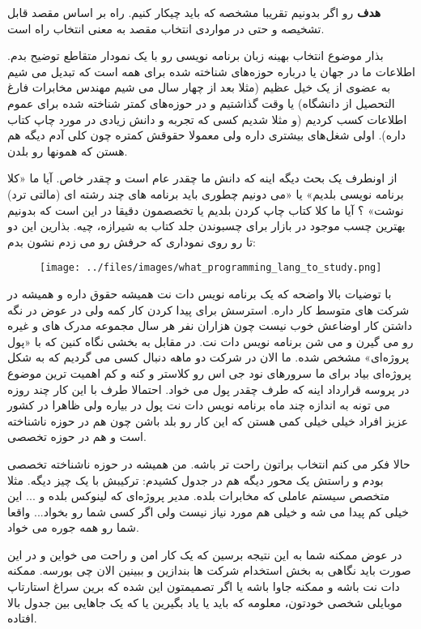 \textbf{هدف}
رو اگر بدونیم تقریبا مشخصه که باید چیکار کنیم. راه بر اساس مقصد قابل تشخیصه و حتی در مواردی انتخاب مقصد به معنی انتخاب راه است.

بذار موضوع انتخاب بهینه زبان برنامه نویسی رو با یک نمودار متقاطع توضیح بدم. اطلاعات ما در جهان یا درباره حوزه‌های شناخته شده برای همه است که تبدیل می شیم به عضوی از یک خیل عظیم (مثلا بعد از چهار سال می شیم مهندس مخابرات فارغ التحصیل از دانشگاه) یا وقت گذاشتیم و در حوزه‌های کمتر شناخته شده برای عموم اطلاعات کسب کردیم (و مثلا شدیم کسی که تجربه و دانش زیادی در مورد چاپ کتاب داره). اولی شغل‌های بیشتری داره ولی معمولا حقوقش کمتره چون کلی آدم دیگه هم هستن که همونها رو بلدن.

 از اونطرف یک بحث دیگه اینه که دانش ما چقدر عام است و چقدر خاص. آیا ما «کلا برنامه نویسی بلدیم» یا «می دونیم چطوری باید برنامه های چند رشته ای (مالتی ترد) نوشت» ؟ آیا ما کلا کتاب چاپ کردن بلدیم یا تخصصمون دقیقا در این است که بدونیم بهترین چسب موجود در بازار برای چسبوندن جلد کتاب به شیرازه، چیه. بذارین این دو تا رو روی نموداری که حرفش رو می زدم نشون بدم:
\begin{figure}[h]
	\begin{center}
		\texttt{[image: ../files/images/what\_programming\_lang\_to\_study.png]}
	\end{center}
\end{figure}
با توضیات بالا واضحه که یک برنامه نویس دات نت همیشه حقوق داره و همیشه در شرکت های متوسط کار داره. استرسش برای پیدا کردن کار کمه ولی در عوض در نگه داشتن کار اوضاعش خوب نیست چون هزاران نفر هر سال مجموعه مدرک های
 و غیره رو می گیرن و می شن برنامه نویس دات نت. در مقابل به بخشی نگاه کنین که با «پول پروژه‌ای» مشخص شده. ما الان در شرکت دو ماهه دنبال کسی می گردیم که به شکل پروژه‌ای بیاد برای ما سرورهای نود جی اس رو کلاستر و  کنه و کم اهمیت ترین موضوع در پروسه قرارداد اینه که طرف چقدر پول می خواد. احتمالا طرف با این کار چند روزه می تونه به اندازه چند ماه برنامه نویس دات نت پول در بیاره ولی ظاهرا در کشور عزیز افراد خیلی خیلی کمی هستن که این کار رو بلد باشن چون هم در حوزه ناشناخته است و هم در حوزه تخصصی.

حالا فکر می کنم انتخاب براتون راحت تر باشه. من همیشه در حوزه ناشناخته تخصصی بودم و راستش یک محور دیگه هم در جدول کشیدم: ترکیبش با یک چیز دیگه. مثلا متخصص سیستم عاملی که مخابرات بلده. مدیر پروژه‌ای که لینوکس بلده و ... این خیلی کم پیدا می شه و خیلی هم مورد نیاز نیست ولی اگر کسی شما رو بخواد... واقعا شما رو همه جوره می خواد.

 در عوض ممکنه شما به این نتیجه برسین که یک کار امن و راحت می خواین و در این صورت باید نگاهی به بخش استخدام شرکت ها بندازین و ببینین الان چی بورسه. ممکنه دات نت باشه و ممکنه جاوا باشه یا اگر تصمیمتون این شده که برین سراغ استارتاپ موبایلی شخصی خودتون، معلومه که باید یا  یاد بگیرین یا  که یک جاهایی بین جدول بالا افتاده.


